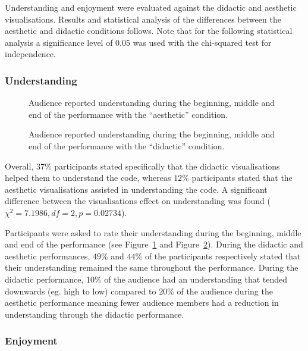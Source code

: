 \documentclass{sig-alternate}
\begin{document}
Understanding and enjoyment were evaluated against the didactic and aesthetic visualisations. Results and statistical analysis of the differences between the aesthetic and didactic conditions follows. Note that for the following statistical analysis a significance level of $0.05$ was used with the chi-squared test for independence.

\subsubsection{Understanding}

\begin{figure}
\centering
{}
\caption{Audience reported understanding during the beginning, middle and end of the performance with the ``aesthetic'' condition.}
\label{fig:aesthetic-understanding}
\end{figure}

\begin{figure}
\centering
{}
\caption{Audience reported understanding during the beginning, middle and end of the performance with the ``didactic'' condition.}
\label{fig:didactic-understanding}
\end{figure}

Overall, $37\%$ participants stated specifically that the didactic visualisations helped them to understand the code, whereas $12\%$ participants stated that the aesthetic visualisations assisted in understanding the code. A significant difference between the visualisations effect on understanding was found ($\chi^2=7.1986,df=2,p=0.02734$).

Participants were asked to rate their understanding during the beginning, middle and end of the performance (see Figure~\ref{fig:aesthetic-understanding} and Figure~\ref{fig:didactic-understanding}). During the didactic and aesthetic performances, $49\%$ and $44\%$ of the participants respectively stated that their understanding remained the same throughout the performance. During the didactic performance, $10\%$ of the audience had an understanding that tended downwards (eg. high to low) compared to $20\%$ of the audience during the aesthetic performance meaning fewer audience members had a reduction in understanding through the didactic performance.

\subsubsection{Enjoyment}
\end{document}
